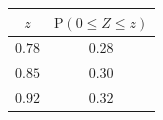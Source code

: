 {\setlength{\tabcolsep}{5pt}\renewcommand{\arraystretch}{1.25}%
\begin{tabular}{|c|c|}
\hline
$z$ & $\mathrm{P}(0\le Z\le z)$ \\
\hline
$0.78$ & $0.28$ \\
\hline
$0.85$ & $0.30$ \\
\hline
$0.92$ & $0.32$ \\
\hline
\end{tabular}}
